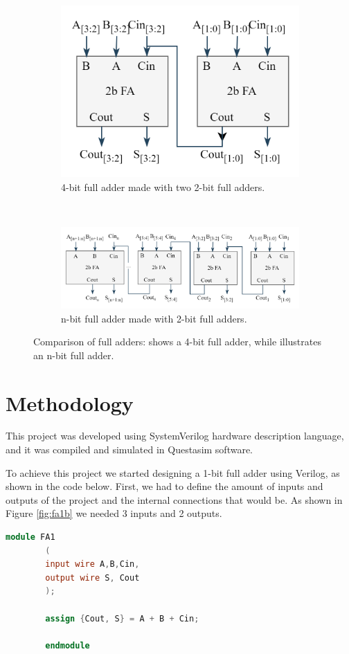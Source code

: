 \documentclass[conference]{IEEEtran}
\begin{document}
	\begin{figure}[H]
		\centering
		\begin{subfigure}[t]{\columnwidth}
			\centering
			\includegraphics[width=0.7\columnwidth]{FA_4B}
			\caption{4-bit full adder made with two 2-bit full adders.}
			\label{fig:fa4b}
		\end{subfigure}
		~
		\begin{subfigure}[t]{\columnwidth}
			\centering
			\includegraphics[width=\columnwidth]{FA_nB}
			\caption{n-bit full adder made with 2-bit full adders.}
			\label{fig:fanb}
		\end{subfigure}
		\caption{Comparison of full adders:  shows a 4-bit full adder, while  illustrates an n-bit full adder.}
		\label{fig:2bfa_comp}
	\end{figure}
	
	
	\section{Methodology}
	This project was developed using SystemVerilog hardware description language, and it was compiled and simulated in Questasim software.
	
	To achieve this project we started designing a 1-bit full adder using Verilog, as shown in the code below. First, we had to define the amount of inputs and outputs of the project and the internal connections that would be. As shown in Figure \ref{fig:fa1b} we needed 3 inputs and 2 outputs.
	\begin{lstlisting}[language=Verilog, 
		caption={Full adder code hardware description in verilog.}, 
		label={code:FA_1B_Code}]
		module FA1
		(
		input wire A,B,Cin,
		output wire S, Cout
		);
		
		assign {Cout, S} = A + B + Cin;
		
		endmodule
		
	\end{lstlisting}
	
\end{document}
